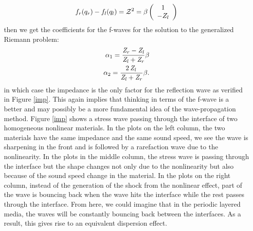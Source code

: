 \documentclass{article}
\begin{document}
\begin{align}
f_r(q_r)-f_l(q_l)={\cal Z}^2=\beta \left( \begin{array}{c}
                      1 \\
                      -Z_l \\
                    \end{array}\right)
\end{align}
then we get the coefficients for the f-waves for the solution to the generalized Riemann problem:
\begin{align}
\alpha_1= {\frac { {\it Z_r}-{\it Z_l}
  }{{\it Z_l}+{\it Z_r}}}\beta\\
\alpha_2=  \frac {{2}\,{\it Z_l}\,}{ {\it Z_l}+{\it Z_r}  }\beta.
\end{align}
in which case the impedance is the only factor for the reflection wave as verified in Figure \ref{imp}. This again implies that thinking in terms of the f-wave is a better and may possibly be a more fundamental idea of the wave-propagation method.
Figure \ref{imp} shows a stress wave passing through the interface of two homogeneous nonlinear materials. In the plots on the left column, the two materials have the same impedance and the same sound speed, we see the wave is sharpening in the front and is followed by a rarefaction wave due to the nonlinearity. In the plots in the middle column, the stress wave is passing through the interface but the shape changes not only due to the nonlinearity but also because of the sound speed change in the material. In the plots on the right column, instead of the generation of the shock from the nonlinear effect, part of the wave is bouncing back when the wave hits the interface while the rest passes through the interface. From here, we could imagine that in the periodic layered media, the waves will be constantly bouncing back between the interfaces. As a result, this gives rise to an equivalent dispersion effect.
\end{document}
